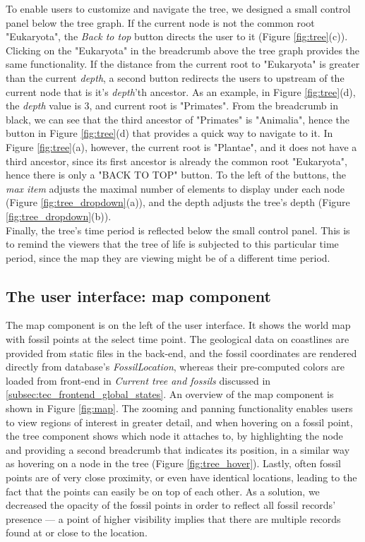 \documentclass[11pt, a4paper,oneside,chapterprefix=false]{scrbook}
\begin{document}
To enable users to customize and navigate the tree, we designed a small control panel below the tree graph. If the current node is not the common root "Eukaryota", the \emph{Back to top} button directs the user to it (Figure \ref{fig:tree}(c)). Clicking on the "Eukaryota" in the breadcrumb above the tree graph provides the same functionality. If the distance from the current root to "Eukaryota" is greater than the current \emph{depth}, a second button redirects the users to upstream of the current node that is it's \emph{depth}'th ancestor. As an example, in Figure \ref{fig:tree}(d), the \emph{depth} value is 3, and current root is "Primates". From the breadcrumb in black, we can see that the third ancestor of "Primates" is "Animalia", hence the button in Figure \ref{fig:tree}(d) that provides a quick way to navigate to it. In Figure \ref{fig:tree}(a), however, the current root is "Plantae", and it does not have a third ancestor, since its first ancestor is already the common root "Eukaryota", hence there is only a "BACK TO TOP" button. To the left of the buttons, the \emph{max item} adjusts the maximal number of elements to display under each node (Figure \ref{fig:tree_dropdown}(a)), and the depth adjusts the tree's depth (Figure \ref{fig:tree_dropdown}(b)). \\

Finally, the tree's time period is reflected below the small control panel. This is to remind the viewers that the tree of life is subjected to this particular time period, since the map they are viewing might be of a different time period. 
 
\subsection{The user interface: map component}\label{subsec:tec_frontend_map}
The map component is on the left of the user interface. It shows the world map with fossil points at the select time point. The geological data on coastlines are provided from static files in the back-end, and the fossil coordinates are rendered directly from database's \emph{FossilLocation}, whereas their pre-computed colors are loaded from front-end in \emph{Current tree and fossils} discussed in \ref{subsec:tec_frontend_global_states}. An overview of the map component is shown in Figure \ref{fig:map}. The zooming and panning functionality enables users to view regions of interest in greater detail, and when hovering on a fossil point, the tree component shows which node it attaches to, by highlighting the node and providing a second breadcrumb that indicates its position, in a similar way as hovering on a node in the tree (Figure \ref{fig:tree_hover}). Lastly, often fossil points are of very close proximity, or even have identical locations, leading to the fact that the points can easily be on top of each other. As a solution, we decreased the opacity of the fossil points in order to reflect all fossil records' presence --- a point of higher visibility implies that there are multiple records found at or close to the location. \\
\end{document}

